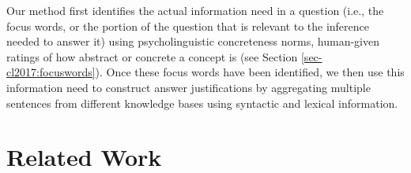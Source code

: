 %

Our method first identifies the actual information need in a question (i.e., the focus words, or the portion of the question that is relevant to the inference needed to answer it) using psycholinguistic concreteness norms, human-given ratings of how abstract or concrete a concept is (see Section \ref{sec-cl2017:focuswords}).
Once these focus words have been identified, we then use this information need to construct answer justifications by aggregating multiple sentences from different knowledge bases using syntactic and lexical information.  

\section{Related Work}


